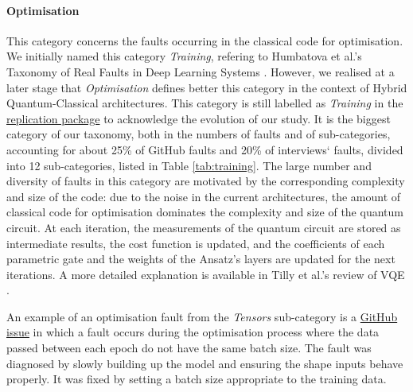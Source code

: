 \paragraph{Optimisation}
This category concerns the faults occurring in the classical code for optimisation. We initially named this category \textit{Training}, refering to Humbatova et al.'s Taxonomy of Real Faults in Deep Learning Systems \cite{humbatova_taxonomy_2019}. However, we realised at a later stage that \textit{Optimisation} defines better this category in the context of Hybrid Quantum-Classical architectures. This category is still labelled as \textit{Training} in the \href{https://anonymous.4open.science/r/A-Taxonomy-of-Real-Faults-in-Hybrid-Quantum-Classical-Architectures-EE25/README.md}{replication package} to acknowledge the evolution of our study.
It is the biggest category of our taxonomy, both in the numbers of faults and of sub-categories, accounting for about 25\% of GitHub faults and 20\% of interviews` faults, divided into 12 sub-categories, listed in Table \ref{tab:training}. 
The large number and diversity of faults in this category are motivated by the corresponding complexity and size of the code: due to the noise in the current architectures, the amount of classical code for optimisation dominates the complexity and size of the quantum circuit. At each iteration, the measurements of the quantum circuit are stored as intermediate results, the cost function is updated, and the coefficients of each parametric gate and the weights of the Ansatz's layers are updated for the next iterations. A more detailed explanation is available in Tilly et al.'s review of VQE \cite{tilly_variational_2022}. 

An example of an optimisation fault from the \textit{Tensors} sub-category is a 
\href{https://github.com/tensorflow/quantum/issues/321}{GitHub issue} in which a fault occurs during the optimisation process where the data passed between each epoch do not have the same batch size. The fault was diagnosed by slowly building up the model and ensuring the shape inputs behave properly. It was fixed by setting a batch size appropriate to the training data. 

